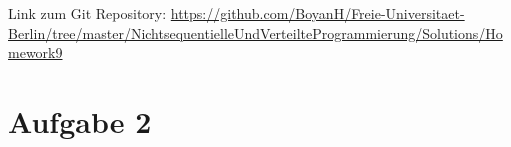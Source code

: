 \usepackage{graphicx}
\usepackage{amsmath}
\usepackage{amssymb}
\usepackage{fancyvrb}

\newcommand{\dozent}{Prof. Dr. Margarita Esponda}					%
\newcommand{\tutor}{Lilli Walter}						%
\newcommand{\tutoriumNo}{6}				%
\newcommand{\projectNo}{9}									%
\newcommand{\veranstaltung}{Nichtsequentielle Programmierung}	%
\newcommand{\semester}{SoeSe 2017}						%
\newcommand{\studenten}{Boyan Hristov, Sergelen Gongor}			%





Link zum Git Repository: \url{https://github.com/BoyanH/Freie-Universitaet-Berlin/tree/master/NichtsequentielleUndVerteilteProgrammierung/Solutions/Homework\projectNo}


\section*{Aufgabe 2}

